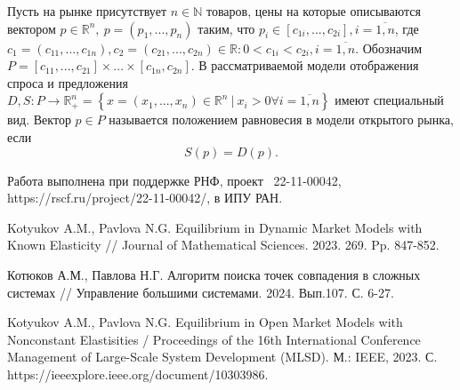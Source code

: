 Пусть на рынке присутствует $n\in\mathbb{N}$ товаров, цены на которые описываются вектором $p\in\mathbb{R}^n, \ p=(p_1,...,p_n)$ таким, что $p_i\in[c_{1i},...,c_{2i}], i =\overline{1,n}$, где $c_1=(c_{11},...,c_{1n}), c_2 = (c_{21},...,c_{2n})\in\mathbb{R}: 0<c_{1i}<c_{2i}, i =\overline{1,n}$. Обозначим $P = [c_{11},...,c_{21}]\times...\times[c_{1n},c_{2n}]$. В рассматриваемой модели отображения спроса и предложения $D,S:P\to\mathbb{R}^n_+ = \left\{x=(x_1,...,x_n)\in\mathbb{R}^n \ | \ x_i > 0 \forall i = \overline{1,n}\right\}$ имеют специальный вид. Вектор $p\in P$ называется положением равновесия в модели открытого рынка, если
$$
S(p) = D(p).
$$



Работа выполнена при поддержке РНФ, проект \textnumero~22-11-00042,  https://rscf.ru/project/22-11-00042/, в ИПУ РАН.
%



\begin{thebibliography}{9} %
 Kotyukov A.M., Pavlova N.G. Equilibrium in Dynamic Market Models with Known Elasticity // Journal of Mathematical Sciences. 2023. 269. Pp. 847-852.

 Котюков А.М., Павлова Н.Г. Алгоритм поиска точек совпадения в сложных системах // Управление большими системами. 2024. Вып.107. С. 6-27.

 Kotyukov A.M., Pavlova N.G. Equilibrium in Open Market Models with Nonconstant Elastisities / Proceedings of the 16th International Conference Management of Large-Scale System Development (MLSD). М.: IEEE, 2023. С. https://ieeexplore.ieee.org/document/10303986.


\end{thebibliography}





%

